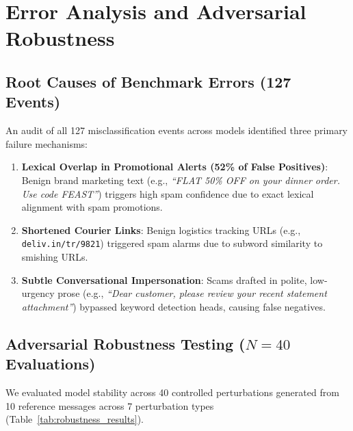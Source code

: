 \documentclass[conference]{IEEEtran}
\begin{document}
\section{Error Analysis and Adversarial Robustness}
\label{sec:error_analysis}

\subsection{Root Causes of Benchmark Errors (127 Events)}
An audit of all 127 misclassification events across models identified three primary failure mechanisms:
\begin{enumerate}
    \item \textbf{Lexical Overlap in Promotional Alerts (52\% of False Positives)}: Benign brand marketing text (e.g., \textit{``FLAT 50\% OFF on your dinner order. Use code FEAST''}) triggers high spam confidence due to exact lexical alignment with spam promotions.
    \item \textbf{Shortened Courier Links}: Benign logistics tracking URLs (e.g., \texttt{deliv.in/tr/9821}) triggered spam alarms due to subword similarity to smishing URLs.
    \item \textbf{Subtle Conversational Impersonation}: Scams drafted in polite, low-urgency prose (e.g., \textit{``Dear customer, please review your recent statement attachment''}) bypassed keyword detection heads, causing false negatives.
\end{enumerate}

\subsection{Adversarial Robustness Testing ($N=40$ Evaluations)}
We evaluated model stability across 40 controlled perturbations generated from 10 reference messages across 7 perturbation types (Table~\ref{tab:robustness_results}).
\end{document}
